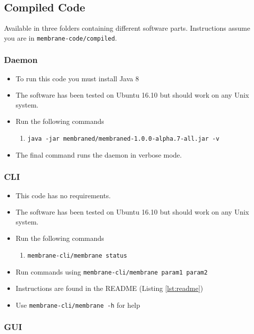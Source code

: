 \documentclass[11pt, a4paper, twoside]{report}
\def\code#1{\texttt{#1}}
\begin{document}
\subsection{Compiled Code}

Available in three folders containing different software parts. Instructions assume you are in \code{membrane-code/compiled}.

\subsubsection{Daemon}

\begin{itemize}
 \item To run this code you must install Java 8
 \item The software has been tested on Ubuntu 16.10 but should work on any Unix system.
 \item Run the following commands
 \begin{enumerate}
  \item \code{java -jar membraned/membraned-1.0.0-alpha.7-all.jar -v}
 \end{enumerate}
 \item The final command runs the daemon in verbose mode.
\end{itemize}

\subsubsection{CLI}

\begin{itemize}
 \item This code has no requirements.
 \item The software has been tested on Ubuntu 16.10 but should work on any Unix system.
 \item Run the following commands
 \begin{enumerate}
  \item \code{membrane-cli/membrane status}
 \end{enumerate}
 \item Run commands using \code{membrane-cli/membrane param1 param2}
 \item Instructions are found in the README (Listing \ref{lst:readme})
 \item Use \code{membrane-cli/membrane -h} for help
\end{itemize}

\subsubsection{GUI}
\end{document}
